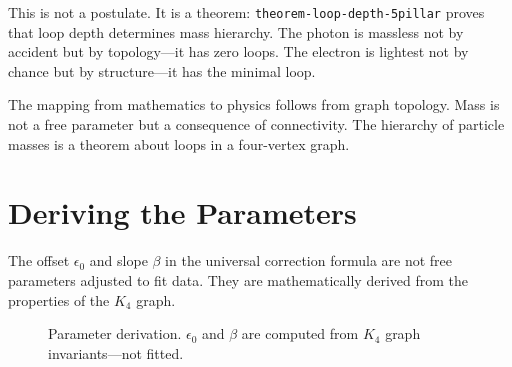 \documentclass[11pt,a4paper]{book}
\begin{document}
This is not a postulate. It is a theorem: \texttt{theorem-loop-depth-5pillar} proves that loop depth determines mass hierarchy. The photon is massless not by accident but by topology---it has zero loops. The electron is lightest not by chance but by structure---it has the minimal loop.

The mapping from mathematics to physics follows from graph topology. Mass is not a free parameter but a consequence of connectivity. The hierarchy of particle masses is a theorem about loops in a four-vertex graph.

\chapter{Deriving the Parameters}

The offset $\epsilon_0$ and slope $\beta$ in the universal correction formula are not free parameters adjusted to fit data.
They are mathematically derived from the properties of the $K_4$ graph.

\begin{figure}[h]
\centering
{}
\caption{Parameter derivation. $\epsilon_0$ and $\beta$ are computed from $K_4$ graph invariants—not fitted.}
\label{fig:parameter-derivation}
\end{figure}
\end{document}
